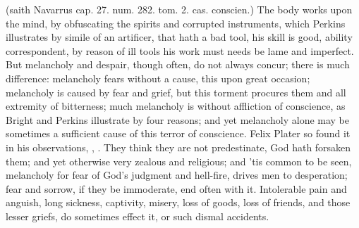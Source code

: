 { (saith Navarrus cap. 27. num. 282. tom. 2. cas. conscien.)
The body works upon the mind, by obfuscating the spirits and corrupted
instruments, which Perkins illustrates by simile of an artificer,
that hath a bad tool, his skill is good, ability correspondent, by
reason of ill tools his work must needs be lame and imperfect. But
melancholy and despair, though often, do not always concur; there is
much difference: melancholy fears without a cause, this upon great
occasion; melancholy is caused by fear and grief, but this torment
procures them and all extremity of bitterness; much melancholy is
without affliction of conscience, as Bright and Perkins
illustrate by four reasons; and yet melancholy alone may be sometimes a
sufficient cause of this terror of conscience. Felix Plater so
found it in his observations, , \etc{}. They think they are not
predestinate, God hath forsaken them; and yet otherwise very zealous
and religious; and 'tis common to be seen, melancholy for fear of God's
judgment and hell-fire, drives men to desperation; fear and sorrow, if
they be immoderate, end often with it. Intolerable pain and anguish,
long sickness, captivity, misery, loss of goods, loss of friends, and
those lesser griefs, do sometimes effect it, or such dismal accidents.

}
